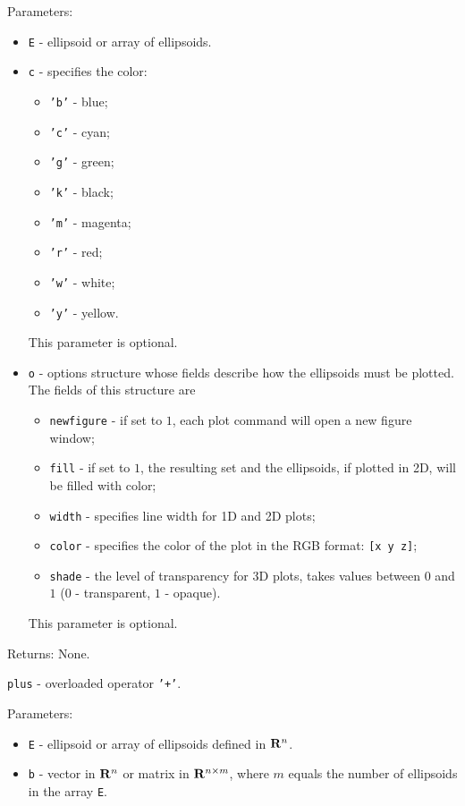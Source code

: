 \documentclass{report}
\begin{document}
Parameters:
\begin{itemize}
\item {\tt E} - ellipsoid or array of ellipsoids.
\item {\tt c} - specifies the color:
\begin{itemize}
\item {\tt 'b'} - blue;
\item {\tt 'c'} - cyan;
\item {\tt 'g'} - green;
\item {\tt 'k'} - black;
\item {\tt 'm'} - magenta;
\item {\tt 'r'} - red;
\item {\tt 'w'} - white;
\item {\tt 'y'} - yellow.
\end{itemize}
This parameter is optional.
\item {\tt o} - options structure whose fields describe how the ellipsoids
must be plotted. The fields of this structure are
\begin{itemize}
\item {\tt newfigure} - if set to $1$, each plot command will open a new
figure window;
\item {\tt fill} - if set to $1$, the resulting set and the ellipsoids,
if plotted in 2D, will be filled with color;
\item {\tt width} - specifies line width for 1D and 2D plots;
\item {\tt color} - specifies the color of the plot in the RGB format:
{\tt [x y z]};
\item {\tt shade} - the level of transparency for 3D plots, takes values
between $0$ and $1$ ($0$ - transparent, $1$ - opaque).
\end{itemize}
This parameter is optional.
\end{itemize}

Returns: None.

\newpage

{\Large {\tt plus}} - overloaded operator {\tt '+'}.

Parameters:
\begin{itemize}
\item {\tt E} - ellipsoid or array of ellipsoids defined in ${\bf R}^n$.
\item {\tt b} - vector in ${\bf R}^n$ or matrix in ${\bf R}^{n\times m}$,
where $m$ equals the number of ellipsoids in the array {\tt E}.
\end{itemize}
\end{document}
